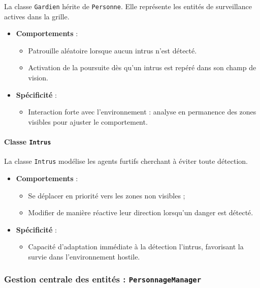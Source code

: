 La classe \texttt{Gardien} hérite de \texttt{Personne}. Elle représente les entités de surveillance actives dans la grille.

\begin{itemize}
    \item \textbf{Comportements} :
    \begin{itemize}
        \item Patrouille aléatoire lorsque aucun intrus n’est détecté.
        \item Activation de la poursuite dès qu'un intrus est repéré dans son champ de vision.
    \end{itemize}
    \item \textbf{Spécificité} :
    \begin{itemize}
        \item Interaction forte avec l’environnement : analyse en permanence des zones visibles pour ajuster le comportement.
    \end{itemize}
\end{itemize}

\vspace{1em}

\paragraph{Classe \texttt{Intrus}}

La classe \texttt{Intrus} modélise les agents furtifs cherchant à éviter toute détection.

\begin{itemize}
    \item \textbf{Comportements} :
    \begin{itemize}
        \item Se déplacer en priorité vers les zones non visibles ;
        \item Modifier de manière réactive leur direction lorsqu’un danger est détecté.
    \end{itemize}
    \item \textbf{Spécificité} :
    \begin{itemize}
        \item Capacité d’adaptation immédiate à la détection l'intrus, favorisant la survie dans l’environnement hostile.
    \end{itemize}
\end{itemize}

\vspace{1em}
\subsubsection{ Gestion centrale des entités : \texttt{PersonnageManager}}

